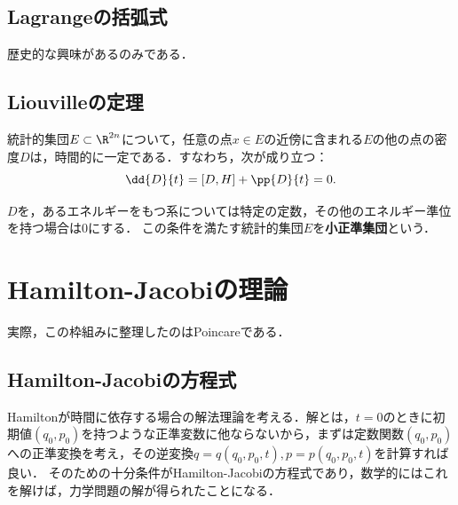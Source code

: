 \documentclass[uplatex,dvipdfmx]{jsreport}
\begin{document}
\subsection{Lagrangeの括弧式}

歴史的な興味があるのみである．

\subsection{Liouvilleの定理}

\begin{theorem}
    統計的集団$E\subset\R^{2n}$について，任意の点$x\in E$の近傍に含まれる$E$の他の点の密度$D$は，時間的に一定である．すなわち，次が成り立つ：
    \[\dd{D}{t}=[D,H]+\pp{D}{t}=0.\]
\end{theorem}

\begin{definition}
    $D$を，あるエネルギーをもつ系については特定の定数，その他のエネルギー準位を持つ場合は$0$にする．
    この条件を満たす統計的集団$E$を\textbf{小正準集団}という．
\end{definition}

\section{Hamilton-Jacobiの理論}

\begin{tcolorbox}[colframe=ForestGreen, colback=ForestGreen!10!white,breakable,colbacktitle=ForestGreen!40!white,coltitle=black,fonttitle=\bfseries\sffamily,
title=]
    実際，この枠組みに整理したのはPoincareである．
\end{tcolorbox}

\subsection{Hamilton-Jacobiの方程式}

\begin{tcolorbox}[colframe=ForestGreen, colback=ForestGreen!10!white,breakable,colbacktitle=ForestGreen!40!white,coltitle=black,fonttitle=\bfseries\sffamily,
title=]
    Hamiltonが時間に依存する場合の解法理論を考える．解とは，$t=0$のときに初期値$(q_0,p_0)$を持つような正準変数に他ならないから，まずは定数関数$(q_0,p_0)$への正準変換を考え，その逆変換$q=q(q_0,p_0,t),p=p(q_0,p_0,t)$を計算すれば良い．
    そのための十分条件がHamilton-Jacobiの方程式であり，数学的にはこれを解けば，力学問題の解が得られたことになる．
\end{tcolorbox}
\end{document}
